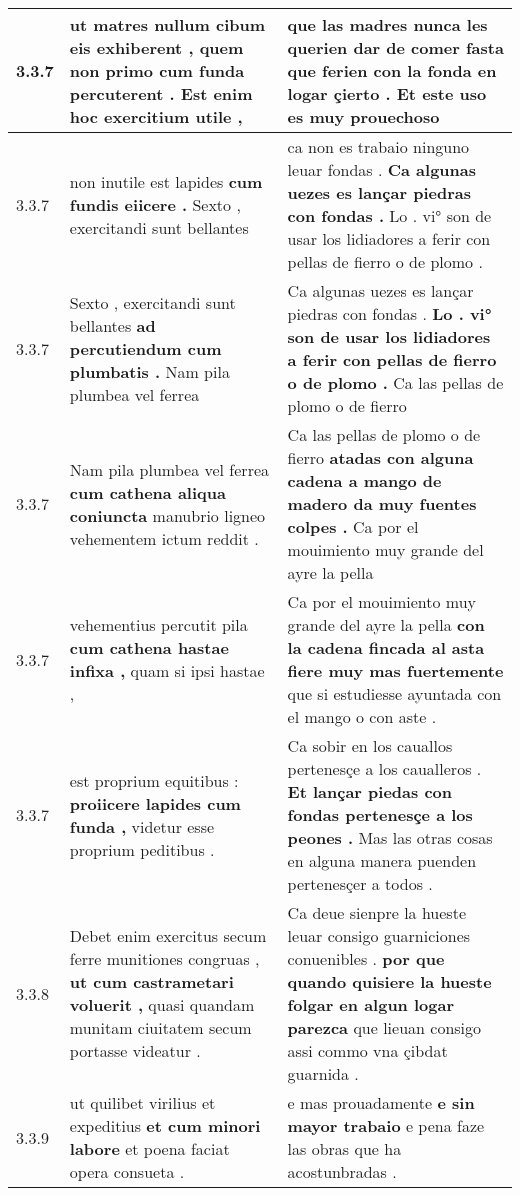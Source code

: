 \begin{tabular}{|p{1cm}|p{6.5cm}|p{6.5cm}|}
3.3.7 & ut matres nullum cibum eis exhiberent , \textbf{ quem non primo cum funda percuterent . } Est enim hoc exercitium utile , & que las madres nunca les querien dar de comer \textbf{ fasta que ferien con la fonda en logar çierto . } Et este uso es muy prouechoso \\\hline
3.3.7 & non inutile est lapides \textbf{ cum fundis eiicere . } Sexto , exercitandi sunt bellantes & ca non es trabaio ninguno leuar fondas . \textbf{ Ca algunas uezes es lançar piedras con fondas . } Lo . vi° son de usar los lidiadores a ferir con pellas de fierro o de plomo . \\\hline
3.3.7 & Sexto , exercitandi sunt bellantes \textbf{ ad percutiendum cum plumbatis . } Nam pila plumbea vel ferrea & Ca algunas uezes es lançar piedras con fondas . \textbf{ Lo . vi° son de usar los lidiadores a ferir con pellas de fierro o de plomo . } Ca las pellas de plomo o de fierro \\\hline
3.3.7 & Nam pila plumbea vel ferrea \textbf{ cum cathena aliqua coniuncta } manubrio ligneo vehementem ictum reddit . & Ca las pellas de plomo o de fierro \textbf{ atadas con alguna cadena a mango de madero da muy fuentes colpes . } Ca por el mouimiento muy grande del ayre la pella \\\hline
3.3.7 & vehementius percutit pila \textbf{ cum cathena hastae infixa , } quam si ipsi hastae , & Ca por el mouimiento muy grande del ayre la pella \textbf{ con la cadena fincada al asta fiere muy mas fuertemente } que si estudiesse ayuntada con el mango o con aste . \\\hline
3.3.7 & est proprium equitibus : \textbf{ proiicere lapides cum funda , } videtur esse proprium peditibus . & Ca sobir en los cauallos pertenesçe a los caualleros . \textbf{ Et lançar piedas con fondas pertenesçe a los peones . } Mas las otras cosas en alguna manera puenden pertenesçer a todos . \\\hline
3.3.8 & Debet enim exercitus secum ferre munitiones congruas , \textbf{ ut cum castrametari voluerit , } quasi quandam munitam ciuitatem secum portasse videatur . & Ca deue sienpre la hueste leuar consigo guarniciones conuenibles . \textbf{ por que quando quisiere la hueste folgar en algun logar parezca } que lieuan consigo assi commo vna çibdat guarnida . \\\hline
3.3.9 & ut quilibet virilius et expeditius \textbf{ et cum minori labore } et poena faciat opera consueta . & e mas prouadamente \textbf{ e sin mayor trabaio } e pena faze las obras que ha acostunbradas . \\\hline

\end{tabular}
